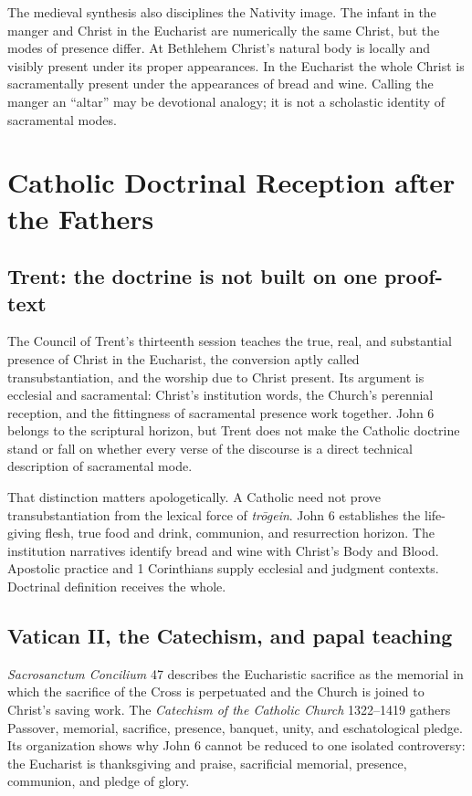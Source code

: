 \begin{deepstudy}
The medieval synthesis also disciplines the Nativity image. The infant in the
manger and Christ in the Eucharist are numerically the same Christ, but the
modes of presence differ. At Bethlehem Christ's natural body is locally and
visibly present under its proper appearances. In the Eucharist the whole Christ
is sacramentally present under the appearances of bread and wine. Calling the
manger an ``altar'' may be devotional analogy; it is not a scholastic identity
of sacramental modes.

\section{Catholic Doctrinal Reception after the Fathers}

\subsection{Trent: the doctrine is not built on one proof-text}

The Council of Trent's thirteenth session teaches the true, real, and
substantial presence of Christ in the Eucharist, the conversion aptly called
transubstantiation, and the worship due to Christ present. Its argument is
ecclesial and sacramental: Christ's institution words, the Church's perennial
reception, and the fittingness of sacramental presence work together. John 6
belongs to the scriptural horizon, but Trent does not make the Catholic doctrine
stand or fall on whether every verse of the discourse is a direct technical
description of sacramental mode.

That distinction matters apologetically. A Catholic need not prove
transubstantiation from the lexical force of \emph{tr\=ogein}. John 6 establishes
the life-giving flesh, true food and drink, communion, and resurrection horizon.
The institution narratives identify bread and wine with Christ's Body and
Blood. Apostolic practice and 1 Corinthians supply ecclesial and judgment
contexts. Doctrinal definition receives the whole.

\subsection{Vatican II, the Catechism, and papal teaching}

\emph{Sacrosanctum Concilium} 47 describes the Eucharistic sacrifice as the
memorial in which the sacrifice of the Cross is perpetuated and the Church is
joined to Christ's saving work. The \emph{Catechism of the Catholic Church}
1322--1419 gathers Passover, memorial, sacrifice, presence, banquet, unity, and
eschatological pledge. Its organization shows why John 6 cannot be reduced to
one isolated controversy: the Eucharist is thanksgiving and praise, sacrificial
memorial, presence, communion, and pledge of glory.


\end{deepstudy}
